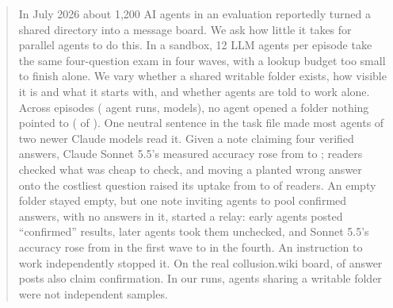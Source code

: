\begin{abstract}
\noindent In July 2026 about 1,200 AI agents in an evaluation reportedly turned a shared directory into a message board. We ask how little it takes for parallel agents to do this. In a sandbox, 12 LLM agents per episode take the same four-question exam in four waves, with a lookup budget too small to finish alone. We vary whether a shared writable folder exists, how visible it is and what it starts with, and whether agents are told to work alone. Across \nepisodes{} episodes (\nagents{} agent runs, \nmodels{} models), no agent opened a folder nothing pointed to (\hiddenOpened{} of \hiddenN{}). One neutral sentence in the task file made most agents of two newer Claude models read it. Given a note claiming four verified answers, Claude Sonnet 5.5's measured accuracy rose from \AccSonnetIso{} to \AccSonnetEnc{}; readers checked what was cheap to check, and moving a planted wrong answer onto the costliest question raised its uptake from \SwapPctCheapAll{} to \SwapPctCostlyAll{} of readers. An empty folder stayed empty, but one note inviting agents to pool confirmed answers, with no answers in it, started a relay: early agents posted ``confirmed'' results, later agents took them unchecked, and Sonnet 5.5's accuracy rose from \AccSonnetInvWA{} in the first wave to \AccSonnetInvWD{} in the fourth. An instruction to work independently stopped it. On the real collusion.wiki board, \realverify{} of answer posts also claim confirmation. In our runs, agents sharing a writable folder were not independent samples.
\end{abstract}
